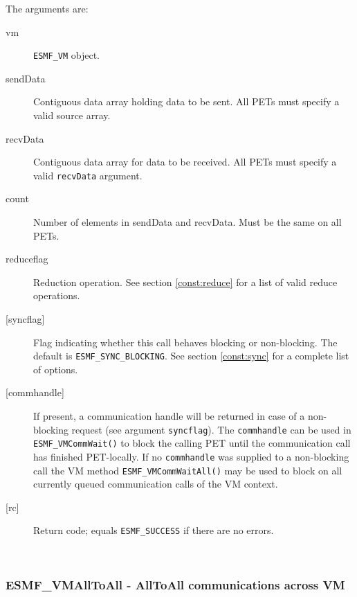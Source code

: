      The arguments are:
     \begin{description}
     \item[vm] 
          {\tt ESMF\_VM} object.
     \item[sendData]
          Contiguous data array holding data to be sent. All PETs must specify a
          valid source array.
     \item[recvData] 
          Contiguous data array for data to be received. All PETs must specify a
          valid {\tt recvData} argument.
     \item[count] 
          Number of elements in sendData and recvData. Must be the same on all
          PETs.
     \item[reduceflag] 
          Reduction operation. See section \ref{const:reduce} for a list of 
          valid reduce operations.
     \item[{[syncflag]}]
          Flag indicating whether this call behaves blocking or non-blocking.
          The default is {\tt ESMF\_SYNC\_BLOCKING}. See section
          \ref{const:sync} for a complete list of options.
     \item[{[commhandle]}]
          If present, a communication handle will be returned in case of a 
          non-blocking request (see argument {\tt syncflag}). The
          {\tt commhandle} can be used in {\tt ESMF\_VMCommWait()} to block the
          calling PET until the communication call has finished PET-locally. If
          no {\tt commhandle} was supplied to a non-blocking call the VM method
          {\tt ESMF\_VMCommWaitAll()} may be used to block on all currently queued
          communication calls of the VM context.
     \item[{[rc]}] 
          Return code; equals {\tt ESMF\_SUCCESS} if there are no errors.
     \end{description}
   
 
\mbox{}\hrulefill\ 
 
\subsubsection [ESMF\_VMAllToAll] {ESMF\_VMAllToAll - AllToAll communications across VM}


